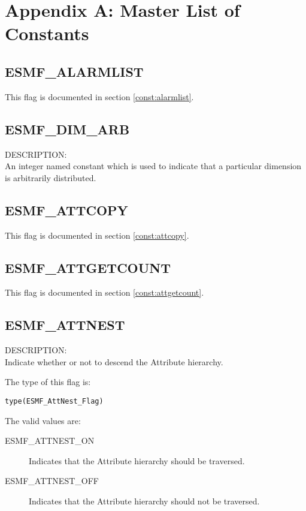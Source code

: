 
\section{Appendix A:  Master List of Constants}
\label{const:master}

\subsection{ESMF\_ALARMLIST}
This flag is documented in section \ref{const:alarmlist}.

\subsection{ESMF\_DIM\_ARB}
\label{const:arbdim}

{\sf DESCRIPTION:\\}
An integer named constant which is used to indicate that a particular dimension is arbitrarily distributed.

\subsection{ESMF\_ATTCOPY}
This flag is documented in section \ref{const:attcopy}.

\subsection{ESMF\_ATTGETCOUNT}
This flag is documented in section \ref{const:attgetcount}.

\subsection{ESMF\_ATTNEST}
\label{const:attnest}
{\sf DESCRIPTION:\\}
Indicate whether or not to descend the Attribute hierarchy.

The type of this flag is:

{\tt type(ESMF\_AttNest\_Flag)}

The valid values are:
\begin{description}
    \item[ESMF\_ATTNEST\_ON]
    Indicates that the Attribute hierarchy should be traversed.
    \item[ESMF\_ATTNEST\_OFF]
    Indicates that the Attribute hierarchy should not be traversed.
\end{description}


